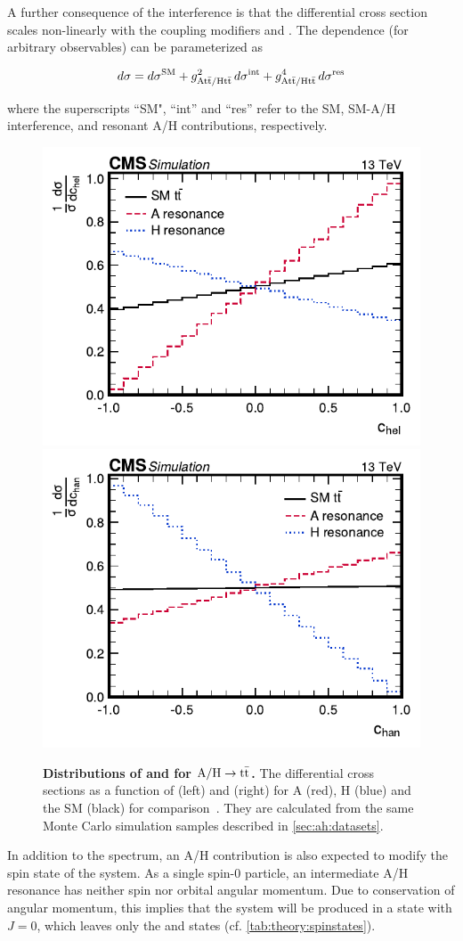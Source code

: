 A further consequence of the interference is that the differential cross section scales non-linearly with the coupling modifiers \gAtt and \gHtt. The dependence (for arbitrary observables) can be parameterized as 

\begin{equation}
\label{eq:theory:ahxs}
    d \sigma = d \sigma^{\mathrm{SM}} + g_{\mathrm{A t \bar{t} / H t \bar{t}}}^2 \, d \sigma^{\mathrm{int}} + g_{\mathrm{A t \bar{t} / H t \bar{t}}}^4 \, d \sigma^{\mathrm{res}}
\end{equation}

\noindent where the superscripts ``SM", ``int'' and ``res'' refer to the SM, SM-A/H interference, and resonant A/H contributions, respectively.

\begin{figure}[t!]
    \centering
    \includegraphics[width=0.49\linewidth]{figures/ah/chel_lhe_paper.pdf}
    \hfill
    \includegraphics[width=0.49\linewidth]{figures/ah/chan_lhe_paper.pdf}
    \caption{\textbf{Distributions of \chel and \chan for $\mathrm{A/H} \rightarrow \mathrm{t \bar{t}}$.} The differential cross sections as a function of \chel (left) and \chan (right) for A (red), H (blue) and the SM (black) for comparison~\cite{CMS:HIG-22-013}. They are calculated from the same Monte Carlo simulation samples described in \cref{sec:ah:datasets}.}
    \label{fig:theory:ah_chelchan}
\end{figure}

In addition to the \mtt spectrum, an A/H contribution is also expected to modify the spin state of the \ttbar system. As a single spin-0 particle, an intermediate A/H resonance has neither spin nor orbital angular momentum. Due to conservation of angular momentum, this implies that the \ttbar system will be produced in a state with $J = 0$, which leaves only the  and  states (cf. \cref{tab:theory:spinstates}).

